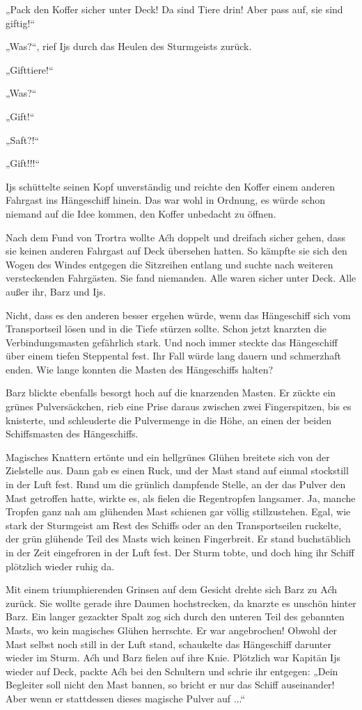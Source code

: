 „Pack den Koffer sicher unter Deck! Da sind Tiere drin! Aber pass auf, sie sind giftig!“

„Was?“, rief Ijs durch das Heulen des Sturmgeists zurück.

„Gifttiere!“

„Was?“

„Gift!“

„Saft?!“

„Gift!!!“

Ijs schüttelte seinen Kopf unverständig und reichte den Koffer einem anderen Fahrgast ins Hängeschiff hinein. Das war wohl in Ordnung, es würde schon niemand auf die Idee kommen, den Koffer unbedacht zu öffnen.

Nach dem Fund von Trortra wollte Aćh doppelt und dreifach sicher gehen, dass sie keinen anderen Fahrgast auf Deck übersehen hatten. So kämpfte sie sich den Wogen des Windes entgegen die Sitzreihen entlang und suchte nach weiteren versteckenden Fahrgästen. Sie fand niemanden. Alle waren sicher unter Deck. Alle außer ihr, Barz und Ijs.

Nicht, dass es den anderen besser ergehen würde, wenn das Hängeschiff sich vom Transportseil lösen und in die Tiefe stürzen sollte. Schon jetzt knarzten die Verbindungsmasten gefährlich stark. Und noch immer steckte das Hängeschiff über einem tiefen Steppental fest. Ihr Fall würde lang dauern und schmerzhaft enden. Wie lange konnten die Masten des Hängeschiffs halten?

Barz blickte ebenfalls besorgt hoch auf die knarzenden Masten. Er zückte ein grünes Pulversäckchen, rieb eine Prise daraus zwischen zwei Fingerspitzen, bis es knisterte, und schleuderte die Pulvermenge in die Höhe, an einen der beiden Schiffsmasten des Hängeschiffs.

Magisches Knattern ertönte und ein hellgrünes Glühen breitete sich von der Zielstelle aus. Dann gab es einen Ruck, und der Mast stand auf einmal stockstill in der Luft fest. Rund um die grünlich dampfende Stelle, an der das Pulver den Mast getroffen hatte, wirkte es, als fielen die Regentropfen langsamer. Ja, manche Tropfen ganz nah am glühenden Mast schienen gar völlig stillzustehen. Egal, wie stark der Sturmgeist am Rest des Schiffs oder an den Transportseilen ruckelte, der grün glühende Teil des Masts wich keinen Fingerbreit. Er stand buchstäblich in der Zeit eingefroren in der Luft fest. Der Sturm tobte, und doch hing ihr Schiff plötzlich wieder ruhig da.

Mit einem triumphierenden Grinsen auf dem Gesicht drehte sich Barz zu Aćh zurück. Sie wollte gerade ihre Daumen hochstrecken, da knarzte es unschön hinter Barz. Ein langer gezackter Spalt zog sich durch den unteren Teil des gebannten Masts, wo kein magisches Glühen herrschte. Er war angebrochen! Obwohl der Mast selbst noch still in der Luft stand, schaukelte das Hängeschiff darunter wieder im Sturm. Aćh und Barz fielen auf ihre Knie. Plötzlich war Kapitän Ijs wieder auf Deck, packte Aćh bei den Schultern und schrie ihr entgegen: „Dein Begleiter soll nicht den Mast bannen, so bricht er nur das Schiff auseinander! Aber wenn er stattdessen dieses magische Pulver auf ...“

